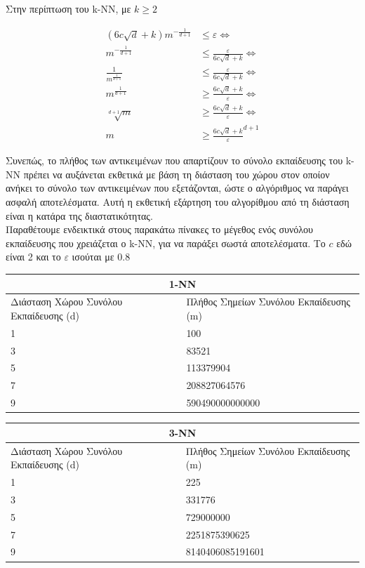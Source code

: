 \documentclass[12pt]{article}
\begin{document}
Στην περίπτωση του k-ΝΝ, με \(k \geq 2\)

\begin{align*}
	(6c \sqrt{d} +k) m^{- \frac{1}{d+1}} &\leq ε \Leftrightarrow \\
	m^{- \frac{1}{d+1}} &\leq \frac{ε}{6c \sqrt{d} + k} \Leftrightarrow \\
	\frac{1}{m^{\frac{1}{d+1}}} &\leq \frac{ε}{6c \sqrt{d} + k} \Leftrightarrow \\
	m^{\frac{1}{d+1}} &\geq \frac{6c \sqrt{d} + k }{ε}\Leftrightarrow \\
	\sqrt[d+1]{m} &\geq \frac{6c \sqrt{d} + k }{ε} \Leftrightarrow \\
	m &\geq \frac{6c \sqrt{d} + k}{ε}^{d+1}
\end{align*}

Συνεπώς, το πλήθος των αντικειμένων που απαρτίζουν το σύνολο εκπαίδευσης του k-NN πρέπει να αυξάνεται εκθετικά με βάση τη διάσταση του χώρου στον οποίον ανήκει το σύνολο των αντικειμένων που εξετάζονται, ώστε ο αλγόριθμος να παράγει ασφαλή αποτελέσματα. Αυτή η εκθετική εξάρτηση του αλγορίθμου από τη διάσταση είναι η κατάρα της διαστατικότητας. \\

Παραθέτουμε ενδεικτικά στους παρακάτω πίνακες το μέγεθος ενός συνόλου εκπαίδευσης που χρειάζεται ο k-NN, για να παράξει σωστά αποτελέσματα. Το  \(c\) εδώ είναι 2 και το \(ε\) ισούται με 0.8 \\

\begin{tabular}{ |p{8cm}|p{8cm}|  }
	\hline
	\multicolumn{2}{|c|}{1-NN} \\
	\hline
	Διάσταση Χώρου Συνόλου Εκπαίδευσης (d) & Πλήθος Σημείων Συνόλου Εκπαίδευσης (m)\\
	\hline
	1   & 100    \\
	3   & 83521    \\
	5   & 113379904    \\
	7   & 208827064576    \\
	9   & 590490000000000    \\
	\hline
\end{tabular}

\medspace

\begin{tabular}{ |p{8cm}|p{8cm}|  }
	\hline
	\multicolumn{2}{|c|}{3-NN} \\
	\hline
	Διάσταση Χώρου Συνόλου Εκπαίδευσης (d) & Πλήθος Σημείων Συνόλου Εκπαίδευσης (m)\\
	\hline
	1   & 225    \\
	3   & 331776    \\
	5   & 729000000    \\
	7   & 2251875390625    \\
	9   & 8140406085191601    \\
	\hline
\end{tabular}
\end{document}

